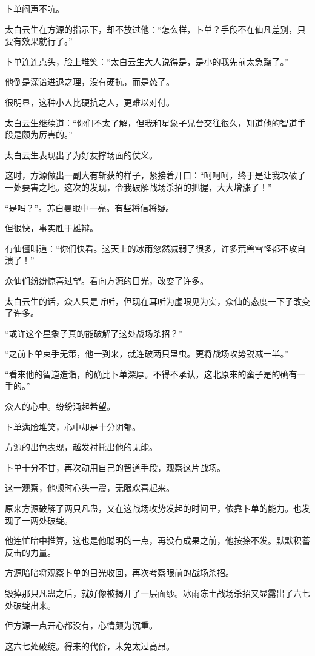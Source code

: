 \begin{this_body}
卜单闷声不吭。

太白云生在方源的指示下，却不放过他：“怎么样，卜单？手段不在仙凡差别，只要有效果就行了。”

卜单连连点头，脸上堆笑：“太白云生大人说得是，是小的我先前太急躁了。”

他倒是深谙进退之理，没有硬抗，而是怂了。

很明显，这种小人比硬抗之人，更难以对付。

太白云生继续道：“你们不太了解，但我和星象子兄台交往很久，知道他的智道手段是颇为厉害的。”

太白云生表现出了为好友撑场面的仗义。

这时，方源做出一副大有斩获的样子，紧接着开口：“呵呵呵，终于是让我攻破了一处要害之地。这次的发现，令我破解战场杀招的把握，大大增涨了！”

“是吗？”。苏白曼眼中一亮。有些将信将疑。

但很快，事实胜于雄辩。

有仙僵叫道：“你们快看。这天上的冰雨忽然减弱了很多，许多荒兽雪怪都不攻自溃了！”

众仙们纷纷惊喜过望。看向方源的目光，改变了许多。

太白云生的话，众人只是听听，但现在耳听为虚眼见为实，众仙的态度一下子改变了许多。

“或许这个星象子真的能破解了这处战场杀招？”

“之前卜单束手无策，他一到来，就连破两只蛊虫。更将战场攻势锐减一半。”

“看来他的智道造诣，的确比卜单深厚。不得不承认，这北原来的蛮子是的确有一手的。”

众人的心中。纷纷涌起希望。

卜单满脸堆笑，心中却是十分阴郁。

方源的出色表现，越发衬托出他的无能。

卜单十分不甘，再次动用自己的智道手段，观察这片战场。

这一观察，他顿时心头一震，无限欢喜起来。

原来方源破解了两只凡蛊，又在这战场攻势发起的时间里，依靠卜单的能力。也发现了一两处破绽。

他连忙暗中推算，这也是他聪明的一点，再没有成果之前，他按捺不发。默默积蓄反击的力量。

方源暗暗将观察卜单的目光收回，再次考察眼前的战场杀招。

毁掉那只凡蛊之后，就好像被揭开了一层面纱。冰雨冻土战场杀招又显露出了六七处破绽出来。

但方源一点开心都没有，心情颇为沉重。

这六七处破绽。得来的代价，未免太过高昂。


\end{this_body}
